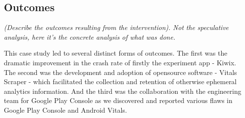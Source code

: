 \subsection{Outcomes}
\textit{(Describe the outcomes resulting from the intervention). Not the speculative analysis, here it’s the concrete analysis of what was done.}

This case study led to several distinct forms of outcomes. The first was the dramatic improvement in the crash rate of firstly the experiment app - Kiwix. The second was the development and adoption of opensource software - Vitals Scraper - which facilitated the collection and retention of otherwise ephemeral analytics information. And the third was the collaboration with the engineering team for Google Play Console as we discovered and reported various flaws in Google Play Console and Android Vitals.

